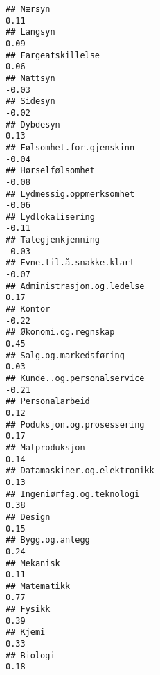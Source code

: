 \documentclass[
]{article}
\begin{document}
\begin{verbatim}
## Nærsyn                                                                            0.11
## Langsyn                                                                           0.09
## Fargeatskillelse                                                                  0.06
## Nattsyn                                                                          -0.03
## Sidesyn                                                                          -0.02
## Dybdesyn                                                                          0.13
## Følsomhet.for.gjenskinn                                                          -0.04
## Hørselfølsomhet                                                                  -0.08
## Lydmessig.oppmerksomhet                                                          -0.06
## Lydlokalisering                                                                  -0.11
## Talegjenkjenning                                                                 -0.03
## Evne.til.å.snakke.klart                                                          -0.07
## Administrasjon.og.ledelse                                                         0.17
## Kontor                                                                           -0.22
## Økonomi.og.regnskap                                                               0.45
## Salg.og.markedsføring                                                             0.03
## Kunde..og.personalservice                                                        -0.21
## Personalarbeid                                                                    0.12
## Poduksjon.og.prosessering                                                         0.17
## Matproduksjon                                                                     0.14
## Datamaskiner.og.elektronikk                                                       0.13
## Ingeniørfag.og.teknologi                                                          0.38
## Design                                                                            0.15
## Bygg.og.anlegg                                                                    0.24
## Mekanisk                                                                          0.11
## Matematikk                                                                        0.77
## Fysikk                                                                            0.39
## Kjemi                                                                             0.33
## Biologi                                                                           0.18

\end{verbatim}
\end{document}
